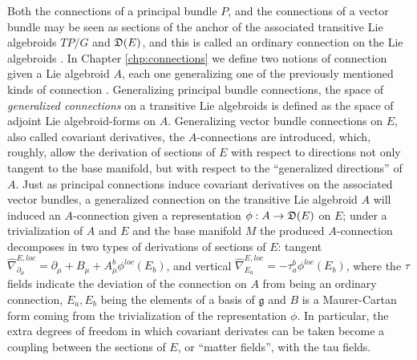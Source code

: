 Both the connections of a principal bundle $P$, and the connections of a vector bundle may be seen as sections of the anchor of the associated transitive Lie algebroids $TP/G$ and $\mathfrak{D}(E)$, and this is called an ordinary connection on the Lie algebroids \cite{Mackenzie2005}. In Chapter \ref{chp:connections} we define two notions of connection given a Lie algebroid $A$, each one generalizing one of the previously mentioned kinds of connection \cite{Lazzarini2012}. Generalizing principal bundle connections, the space of \textit{generalized connections} on a transitive Lie algebroids is defined as the space of adjoint Lie algebroid-forms on $A$. Generalizing vector bundle connections on $E$, also called covariant derivatives, the $A$-connections are introduced, which, roughly, allow the derivation of sections of $E$ with respect to directions not only tangent to the base manifold, but with respect to the ``generalized directions'' of $A$. Just as principal connections induce covariant derivatives on the associated vector bundles, a generalized connection on the transitive Lie algebroid $A$ will induced an $A$-connection given a representation $\phi:A \to \alg D(E)$ on $E$; under a trivialization of $A$ and $E$ and the base manifold $M$ the produced $A$-connection decomposes in two types of derivations of sections of $E$: tangent $\hat \nabla^{E, loc}_{\partial_\mu} = \partial_\mu + B_\mu + A^b_\mu \phi^{loc}(E_b)$, and vertical $\hat \nabla^{E, loc}_{E_a} = - \tau^b_a \phi^{loc} (E_b)$, where the $\tau$ fields indicate the deviation of the connection on $A$ from being an ordinary connection, $E_a, E_b$ being the elements of a basis of $\mathfrak g$ and $B$ is a Maurer-Cartan form coming from the trivialization of the representation $\phi$. In particular, the extra degrees of freedom in which covariant derivates can be taken become a coupling between the sections of $E$, or ``matter fields'', with the tau fields. 

